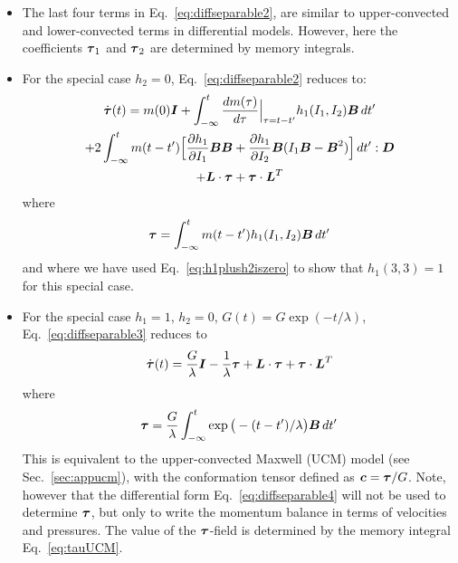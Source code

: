 \begin{itemize}
The fourth-order tensor $\mathbb K$ cannot be reduced to a function of the stress, which is the reason that integral models cannot be reduced to differential models, except for special cases (see below for the example of a UCM model). 
\item The last four terms in Eq.~\eqref{eq:diffseparable2}, are similar to upper-convected and lower-convected terms in differential models. However, here the coefficients $\boldsymbol{\tau}_1$ and $\boldsymbol{\tau}_2$ are determined by memory integrals.
\item
For the special case $h_2=0$, Eq.~\eqref{eq:diffseparable2} reduces to:
\begin{multline}
  \dot{\boldsymbol{\tau}}(t) = m(0)\boldsymbol{I}
  +\int_{-\infty}^t\dfrac{d m(\tau)}{d \tau}\Big|_{\tau=t-t'}h_1(I_1,I_2)\boldsymbol{B}\,dt'\\
  +2\int_{-\infty}^tm(t-t')\Big[\dfrac{\partial h_1}{\partial I_1}\boldsymbol{B}\boldsymbol{B}+\dfrac{\partial h_1}{\partial I_2}\boldsymbol{B}(I_1\boldsymbol{B}-\boldsymbol{B}^2)\Big]\,dt':\boldsymbol{D}\\
            +\boldsymbol{L}\cdot \boldsymbol{\tau}+\boldsymbol{\tau} \cdot\boldsymbol{L}^T
  \label{eq:diffseparable3}
\end{multline}
where 
\begin{equation}
  \boldsymbol{\tau}=\int_{-\infty}^tm(t-t')h_1(I_1,I_2)\boldsymbol{B}\,dt' 
\end{equation}
and where we have used Eq.~\eqref{eq:h1plush2iszero} to show that $h_1(3,3)=1$ for this special case.
\item 
For the special case $h_1=1$, $h_2=0$, $G(t)=G\exp ( -t/\lambda)$,  Eq.~\eqref{eq:diffseparable3} reduces to
\begin{equation}
  \dot{\boldsymbol{\tau}}(t) = \frac{G}{\lambda}\boldsymbol{I} - \frac1\lambda \boldsymbol{\tau}
            +\boldsymbol{L}\cdot \boldsymbol{\tau}+\boldsymbol{\tau} \cdot\boldsymbol{L}^T
  \label{eq:diffseparable4}
\end{equation}
where 
\begin{equation}
  \boldsymbol{\tau}=\frac{G}\lambda \int_{-\infty}^t\exp\big(-(t-t')/\lambda\big)\boldsymbol{B}\,dt'
  \label{eq:tauUCM} 
\end{equation}
This is equivalent to the upper-convected Maxwell (UCM) model (see Sec.~\ref{sec:appucm}), with the conformation tensor defined as $\boldsymbol{c}=\boldsymbol{\tau}/G$. Note, however that the differential form Eq.~\eqref{eq:diffseparable4} will not be used to determine $\boldsymbol{\tau}$, but only to write the momentum balance in terms of velocities and pressures. The value of the $\boldsymbol{\tau}$-field is determined by the memory integral Eq.~\eqref{eq:tauUCM}.
\end{itemize}

